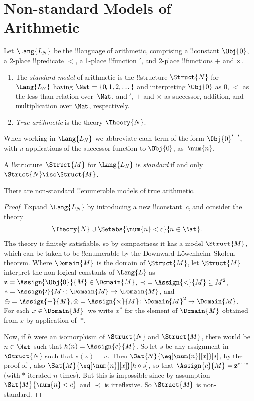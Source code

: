 \documentclass[../../../include/open-logic-section]{subfiles}
\begin{document}
\section{Non-standard Models of Arithmetic}

\begin{defn}
Let $\Lang{L_N}$ be the !!{language} of arithmetic, comprising a
!!{constant} $\Obj{0}$, a 2-place !!{predicate} $<$, a 1-place
!!{function} $\prime$, and 2-place !!{function}s $+$ and $\times$.
\begin{enumerate}
\item The \emph{standard model} of arithmetic is the !!{structure}
  $\Struct{N}$ for $\Lang{L_N}$ having $\Nat = \{ 0, 1, 2, \dots\}$
  and interpreting $\Obj{0}$ as $0$, $<$ as the less-than relation
  over~$\Nat$, and $\prime$, $+$ and $\times$ as successor, addition,
  and multiplication over $\Nat$, respectively.
\item \emph{True arithmetic} is the theory $\Theory{N}$.
\end{enumerate}
\end{defn}

When working in $\Lang{L_N}$ we abbreviate each term of
the form $\Obj{0}^{\prime\dots\prime}$, with $n$ applications of the
successor function to $\Obj{0}$, as~$\num{n}$.

\begin{defn}
A !!{structure}~$\Struct{M}$ for $\Lang{L_N}$ is \emph{standard} if
and only $\Struct{N} \iso \Struct{M}$.
\end{defn}

\begin{thm}
There are non-standard !!{enumerable} models of true arithmetic.
\end{thm}

\begin{proof}
Expand $\Lang{L_N}$ by introducing a new !!{constant}~$c$, and
consider the theory
\[
\Theory{N} \cup \Setabs{\num{n} < c}{n \in \Nat}.
\]
The theory is finitely satisfiable, so by compactness it has a model
$\Struct{M}$, which can be taken to be !!{enumerable} by the Downward
L\"owenheim--Skolem theorem. Where $\Domain{M}$ is the domain of
$\Struct{M}$, let $\Struct{M}$ interpret the non-logical constants of
$\Lang{L}$ as $\mathbf{z} = \Assign{\Obj{0}}{M} \in \Domain{M}$, ${\prec} =
\Assign{<}{M} \subseteq M^2$, $* = \Assign{\prime}{M} \colon
\Domain{M} \to \Domain{M}$, and $\oplus = \Assign{+}{M}, \otimes =
\Assign{\times}{M} \colon \Domain{M}^2 \to \Domain{M}$. For each $x
\in \Domain{M}$, we write $x^*$ for the element of $\Domain{M}$
obtained from $x$ by application of~$*$.

Now, if $h$ were an isomorphism of $\Struct{N}$ and $\Struct{M}$,
there would be $n \in \Nat$ such that $h(n) = \Assign{c}{M}$.  So let
$s$ be any assignment in $\Struct{N}$ such that $s(x) = n$. Then
$\Sat{N}{\eq[\num{n}][x]}[s]$; by the proof of ,
also $\Sat{M}{\eq[\num{n}][x]}[h \circ s]$, so that $\Assign{c}{M} =
\mathbf{z}^{*\cdots *}$ (with $*$ iterated $n$ times). But this is impossible
since by assumption $\Sat{M}{\num{n} < c}$ and $\prec$ is
irreflexive. So $\Struct{M}$ is non-standard.
\end{proof}
\end{document}

